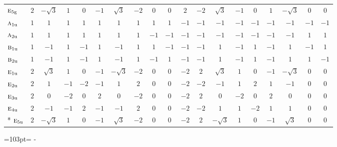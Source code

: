 \documentclass[10pt,a4paper]{article}
\newcommand{\needspace}[1]{\par\penalty-100\begingroup\dimen0=#1\relax\dimen2=\pagegoal
  \advance\dimen2-\pagetotal\ifdim\dimen0>\dimen2\relax\ifdim\dimen2>0pt\vfil\break\fi\fi
  \endgroup}
\numberwithin{equation}{section}
\newcommand{\irr}[1]{\text{\normalfont\scshape #1}}
\newcommand{\ptag}[1]{\mathrm{#1}}
\begin{document}
{\begin{longtable}{@{}lcccccccccccccccccc@{}}
$\irr{e}_{5\ptag{g}}$ & $2$ & $-\sqrt{3}$ & $1$ & $0$ & $-1$ & $\sqrt{3}$ & $-2$ & $0$ & $0$ & $2$ & $-2$ & $\sqrt{3}$ & $-1$ & $0$ & $1$ & $-\sqrt{3}$ & $0$ & $0$\\
$\irr{a}_{1\ptag{u}}$ & $1$ & $1$ & $1$ & $1$ & $1$ & $1$ & $1$ & $1$ & $1$ & $-1$ & $-1$ & $-1$ & $-1$ & $-1$ & $-1$ & $-1$ & $-1$ & $-1$\\
$\irr{a}_{2\ptag{u}}$ & $1$ & $1$ & $1$ & $1$ & $1$ & $1$ & $1$ & $-1$ & $-1$ & $-1$ & $-1$ & $-1$ & $-1$ & $-1$ & $-1$ & $-1$ & $1$ & $1$\\
$\irr{b}_{1\ptag{u}}$ & $1$ & $-1$ & $1$ & $-1$ & $1$ & $-1$ & $1$ & $1$ & $-1$ & $-1$ & $-1$ & $1$ & $-1$ & $1$ & $-1$ & $1$ & $-1$ & $1$\\
$\irr{b}_{2\ptag{u}}$ & $1$ & $-1$ & $1$ & $-1$ & $1$ & $-1$ & $1$ & $-1$ & $1$ & $-1$ & $-1$ & $1$ & $-1$ & $1$ & $-1$ & $1$ & $1$ & $-1$\\
$\irr{e}_{1\ptag{u}}$ & $2$ & $\sqrt{3}$ & $1$ & $0$ & $-1$ & $-\sqrt{3}$ & $-2$ & $0$ & $0$ & $-2$ & $2$ & $\sqrt{3}$ & $1$ & $0$ & $-1$ & $-\sqrt{3}$ & $0$ & $0$\\
$\irr{e}_{2\ptag{u}}$ & $2$ & $1$ & $-1$ & $-2$ & $-1$ & $1$ & $2$ & $0$ & $0$ & $-2$ & $-2$ & $-1$ & $1$ & $2$ & $1$ & $-1$ & $0$ & $0$\\
$\irr{e}_{3\ptag{u}}$ & $2$ & $0$ & $-2$ & $0$ & $2$ & $0$ & $-2$ & $0$ & $0$ & $-2$ & $2$ & $0$ & $-2$ & $0$ & $2$ & $0$ & $0$ & $0$\\
$\irr{e}_{4\ptag{u}}$ & $2$ & $-1$ & $-1$ & $2$ & $-1$ & $-1$ & $2$ & $0$ & $0$ & $-2$ & $-2$ & $1$ & $1$ & $-2$ & $1$ & $1$ & $0$ & $0$\\*
$\irr{e}_{5\ptag{u}}$ & $2$ & $-\sqrt{3}$ & $1$ & $0$ & $-1$ & $\sqrt{3}$ & $-2$ & $0$ & $0$ & $-2$ & $2$ & $-\sqrt{3}$ & $1$ & $0$ & $-1$ & $\sqrt{3}$ & $0$ & $0$\\
\bottomrule\end{longtable}}
\needspace{103pt}
\end{document}
